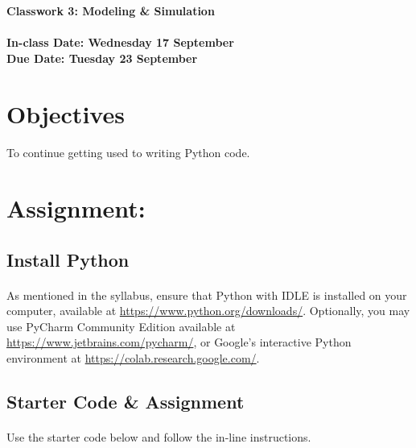 \documentclass[letter,10pt]{article}
\begin{document}
    \huge
    \textbf{Classwork 3: Modeling \& Simulation}
    \normalsize
    \\ ~~ \\
    \textbf{In-class Date: Wednesday 17 September} \\
    \textbf{Due Date: Tuesday 23 September}
    
    \section*{Objectives}
    \paragraph{}To continue getting used to writing Python code.
    
    \section*{Assignment:}
    \subsection{Install Python}
    \paragraph{}As mentioned in the syllabus, ensure that Python with IDLE is installed on your computer, available at \url{https://www.python.org/downloads/}. Optionally, you may use PyCharm Community Edition available at \url{https://www.jetbrains.com/pycharm/}, or Google's interactive Python environment at \url{https://colab.research.google.com/}.
    
    \subsection*{Starter Code \& Assignment}
    \paragraph{}Use the starter code below and follow the in-line instructions.
    
\end{document}
